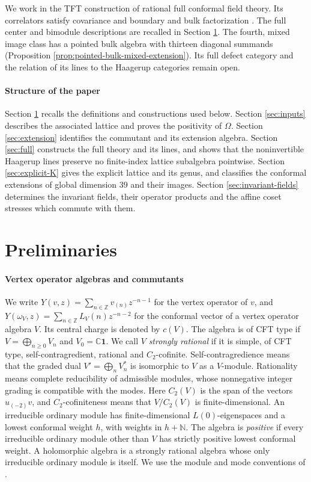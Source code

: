 \documentclass[leqno]{article}
\newcommand{\Cbb}{\ensuremath{\mathbb{C}}}
\newcommand{\N}{\ensuremath{\mathbb{N}}}
\newcommand{\Z}{\ensuremath{\mathbb{Z}}}
\renewcommand{\geq}{\ensuremath{\geqslant}}
\numberwithin{equation}{section}
\begin{document}
We work in the TFT construction of rational full conformal field theory. Its correlators satisfy covariance and boundary and bulk factorization \cite[Theorems 2.2 p.~7, 2.9 p.~16 and 2.13 p.~19]{FFRS06}. The full center and bimodule descriptions are recalled in Section \ref{preliminaries}. The fourth, mixed image class has a pointed bulk algebra with thirteen diagonal summands (Proposition \ref{prop:pointed-bulk-mixed-extension}). Its full defect category and the relation of its lines to the Haagerup categories remain open.

\paragraph{Structure of the paper}
Section \ref{preliminaries} recalls the definitions and constructions used below. Section \ref{sec:inputs} describes the associated lattice and proves the positivity of $\Omega$. Section \ref{sec:extension} identifies the commutant and its extension algebra. Section \ref{sec:full} constructs the full theory and its lines, and shows that the noninvertible Haagerup lines preserve no finite-index lattice subalgebra pointwise. Section \ref{sec:explicit-K} gives the explicit lattice and its genus, and classifies the conformal extensions of global dimension $39$ and their images. Section \ref{sec:invariant-fields} determines the invariant fields, their operator products and the affine coset stresses which commute with them.

\section{Preliminaries}
\label{preliminaries}

\paragraph{Vertex operator algebras and commutants}
We write $Y(v,z) = \sum_{n \in \Z} v_{(n)}z^{-n-1}$ for the vertex operator of $v$, and $Y(\omega_V,z) = \sum_{n \in \Z}L_V(n)z^{-n-2}$ for the conformal vector of a vertex operator algebra $V$. Its central charge is denoted by $c(V)$. The algebra is of CFT type if $V = \bigoplus_{n \geq 0}V_n$ and $V_0 = \Cbb\mathbf1$. We call $V$ \emph{strongly rational} if it is simple, of CFT type, self-contragredient, rational and $C_2$-cofinite. Self-contragredience means that the graded dual $V' = \bigoplus_n V_n^*$ is isomorphic to $V$ as a $V$-module. Rationality means complete reducibility of admissible modules, whose nonnegative integer grading is compatible with the modes. Here $C_2(V)$ is the span of the vectors $u_{(-2)}v$, and $C_2$-cofiniteness means that $V/C_2(V)$ is finite-dimensional. An irreducible ordinary module has finite-dimensional $L(0)$-eigenspaces and a lowest conformal weight $h$, with weights in $h+\N$. The algebra is \emph{positive} if every irreducible ordinary module other than $V$ has strictly positive lowest conformal weight. A holomorphic algebra is a strongly rational algebra whose only irreducible ordinary module is itself. We use the module and mode conventions of \cite{LL04}.
\end{document}
